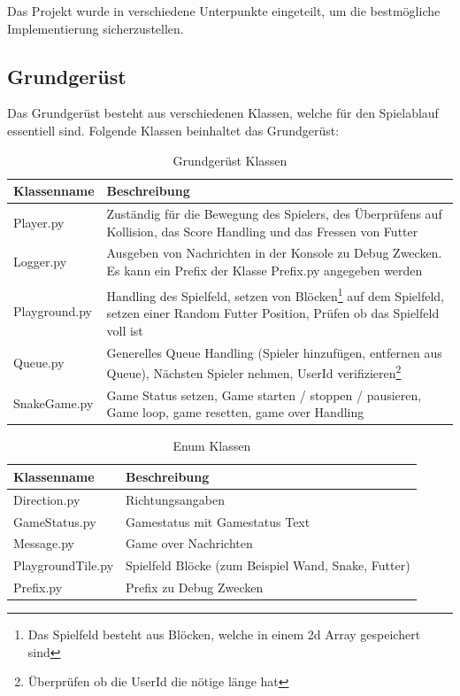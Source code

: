 \documentclass[a4paper,12pt]{scrartcl}
\begin{document}
Das Projekt wurde in verschiedene Unterpunkte eingeteilt, um die bestmögliche Implementierung sicherzustellen.


\subsection{Grundgerüst}
Das Grundgerüst besteht aus verschiedenen Klassen, welche für den Spielablauf essentiell sind. Folgende Klassen beinhaltet das Grundgerüst:

\newpage

\begin{table}
\centering
\begin{tabular}[!htb]{p{4cm}|p{10cm}}
Klassenname & Beschreibung \\
\hline
Player.py & Zuständig für die Bewegung des Spielers, des Überprüfens auf Kollision, das Score Handling und das Fressen von Futter \\
Logger.py & Ausgeben von Nachrichten in der Konsole zu Debug Zwecken. Es kann ein Prefix der Klasse Prefix.py angegeben werden \\
Playground.py & Handling des Spielfeld, setzen von Blöcken\footnote{Das Spielfeld besteht aus Blöcken, welche in einem 2d Array gespeichert sind} auf dem Spielfeld, setzen einer Random Futter Position, Prüfen ob das Spielfeld voll ist \\
Queue.py & Generelles Queue Handling (Spieler hinzufügen, entfernen aus Queue), Nächsten Spieler nehmen, UserId verifizieren\footnote{Überprüfen ob die UserId die nötige länge hat} \\
SnakeGame.py & Game Status setzen, Game starten / stoppen / pausieren, Game loop, game resetten, game over Handling \\
\end{tabular}
\caption{Grundgerüst Klassen}
\end{table}

\begin{table}
\centering
\begin{tabular}[!htb]{p{4cm}|p{10cm}}
Klassenname & Beschreibung \\
\hline
Direction.py & Richtungsangaben \\
GameStatus.py & Gamestatus mit Gamestatus Text \\
Message.py & Game over Nachrichten \\
PlaygroundTile.py & Spielfeld Blöcke (zum Beispiel Wand, Snake, Futter) \\
Prefix.py & Prefix zu Debug Zwecken \\
\end{tabular}
\caption{Enum Klassen}
\end{table}
\end{document}
